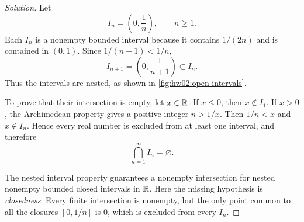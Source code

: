 
\begin{proof}[Solution]
Let
\[
  I_n=\left(0,\frac1n\right),\qquad n\geq1.
\]
Each $I_n$ is a nonempty bounded interval because it contains $1/(2n)$
and is contained in $(0,1)$. Since $1/(n+1)<1/n$,
\[
  I_{n+1}=\left(0,\frac1{n+1}\right)
    \subset I_n.
\]
Thus the intervals are nested, as shown in
\autoref{fig:hw02:open-intervals}.
\begin{marginfigure}
  \centering
  
  \caption[Nested open intervals.]{The nested intervals $I_n=(0,1/n)$ exclude $0$.}
  \label{fig:hw02:open-intervals}
\end{marginfigure}

To prove that their intersection is empty, let $x\in\mathbb{R}$.
If $x\leq0$, then $x\notin I_1$. If $x>0$, the Archimedean
property gives a positive integer $n>1/x$.
Then $1/n<x$ and $x\notin I_n$.
Hence every real number is excluded from at least one interval,
and therefore
\[
  \bigcap_{n=1}^{\infty}I_n=\varnothing.
\]

The nested interval property guarantees a nonempty intersection
for nested nonempty bounded closed intervals in $\mathbb{R}$. Here the
missing hypothesis is \emph{closedness}. Every finite intersection
is nonempty, but the only point common to all the closures
$[0,1/n]$ is $0$, which is excluded from every $I_n$.
\end{proof}
